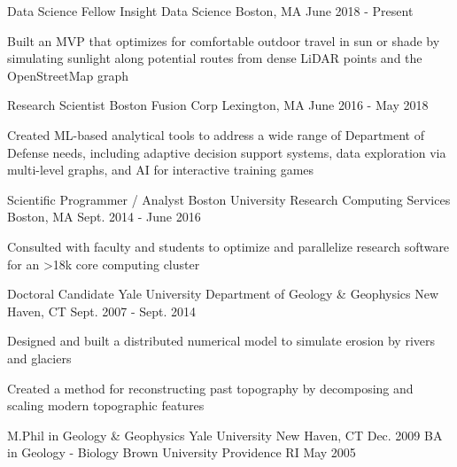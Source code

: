 \documentclass[11pt, a4paper]{awesome-cv}
\begin{document}
\begin{cventries}
  \cventrytight
    {Data Science Fellow}
    {Insight Data Science}
    {Boston, MA}
    {June 2018 - Present}
    {
    \begin{cvitems}
      \item Built an MVP  that optimizes for comfortable outdoor travel in sun or shade by simulating sunlight along potential routes from dense LiDAR points and the OpenStreetMap graph
    \end{cvitems}
    }

  \cventrytight
    {Research Scientist}
    {Boston Fusion Corp}
    {Lexington, MA}
    {June 2016 - May 2018}
    {
      \begin{cvitems}
        \item Created ML-based analytical tools to address a wide range of Department of Defense needs, including adaptive decision support systems, data exploration via multi-level graphs, and AI for interactive training games
      \end{cvitems}
    }

  \cventrytight
    {Scientific Programmer / Analyst}
    {Boston University Research Computing Services}
    {Boston, MA}
    {Sept. 2014 - June 2016}
    {
      \begin{cvitems}
        \item {Consulted with faculty and students to optimize and parallelize research software for an >18k core computing cluster} 
      \end{cvitems}
    }

  \cventrytight
    {Doctoral Candidate}
    {Yale University Department of Geology \& Geophysics}
    {New Haven, CT}
    {Sept. 2007 - Sept. 2014}
    {
      \begin{cvitems}
        \item {Designed and built a distributed numerical model to simulate erosion by rivers and glaciers}
        \item {Created a method for reconstructing past topography by decomposing and scaling modern topographic features}
      \end{cvitems} 
    }

\end{cventries}

\vspace{-1em}

\begin{cventries}
  \cventry
    {M.Phil in Geology \& Geophysics}
    {Yale University}
    {New Haven, CT}
    {Dec. 2009}
    {}
  \cventry
    {BA in Geology - Biology}
    {Brown University}
    {Providence RI}
    {May 2005}
    {}
\end{cventries}
\end{document}
